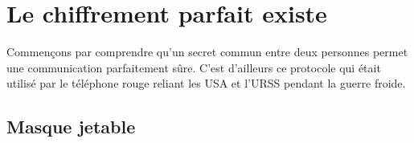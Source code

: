 \documentclass[11pt,class=report,crop=false]{standalone}
\begin{document}




\section{Le chiffrement parfait existe}


Commençons par comprendre qu'un secret commun entre deux personnes permet une communication parfaitement sûre. 
C'est d'ailleurs ce protocole qui était utilisé par le \og{}téléphone rouge\fg{} reliant les USA et l'URSS pendant la guerre froide.

\subsection{Masque jetable}

\end{document}
